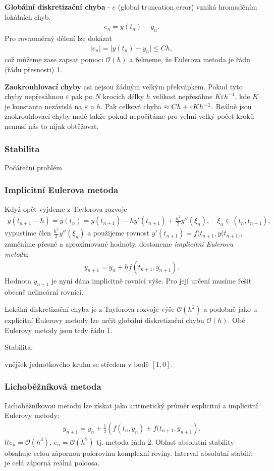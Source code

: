 \textbf{Globální diskretizační chyba} - $e$ (global truncation error) vzniká hromaděním lokálních chyb. 
\begin{align}
e_{n}= y(t_{n})-y_{n}.
\end{align}
Pro rovnoměrný dělení lze dokázat 
\begin{align}
\vert e_{n} \vert = \vert y(t_{n})-y_{n} \vert \leq C h,
\end{align}
což můžeme zase zapsat pomoci $\mathcal{O}(h)$ a řekneme, že Eulerova metoda je řádu (řádu přesnosti) 1. 

\textbf{Zaokrouhlovací chyby} asi nejsou žádným velkým překvápkem. Pokud tyto chyby nepřesáhnou $\varepsilon$ pak po $N$ krocích délky $h$ velikost nepřesáhne $K \varepsilon h^{-1}$, kde $K$ je konstanta nezávislá na $\varepsilon$ a $ h$. Pak celková chyba $\approx Ch+ \varepsilon K h^{-1}$. Reálně jsou zaokrouhlovací chyby malé takže pokud nepočítáme pro velmi velký počet kroků nemusí nás to nijak obtěžovat. 

\subsubsection*{Stabilita}
Počáteční problém
\subsubsection*{Implicitní Eulerova metoda}
Když opět vyjdeme z Taylorova rozvoje
\begin{align}
y(t_{n+1}-h)= y(t_{n}) = y(t_{n+1}) -hy'(t_{n+1})+ \frac{h^{2}}{2} y'' (\xi_{n}), \quad \xi_{n} \in (t_{n},t_{n+1}),
\end{align}
vypustíme člen $\frac{h^{2}}{2} y'' (\xi_{n})$ a použijeme rovnost $y'(t_{n+1})=f(t_{n+1},y(t_{n+1)}$, zaměníme přesné a aproximované hodnoty, dostaneme \textit{implicitní Eulerovu metodu}:
\begin{align}
y_{n+1}=y_{n}+h f(t_{n+1},y_{n+1}).
\end{align}
Hodnota $y_{n+1}$ je nyní dána implicitně rovnicí výše. Pro její určení musíme řešit obecně nelineární rovnici. 

Lokální diskretizační chyba je z Taylorova rozvoje výše  $\mathcal{O}(h^{2})$ a podobně jako u explicitní Eulerovy metody lze určit globální diskretizační chybu $\mathcal{O}(h)$. Obě Eulerovy metody jsou tedy řádu 1. 

Stabilita: 

vnějšek jednotkového kruhu se středem v bodě $[1,0]$. 

\subsubsection*{Lichoběžníková metoda}
Lichoběžníkovou metodu lze získat jako aritmetický průměr explicitní a implicitní Eulerovy metody:
\begin{align}
y_{n+1}= y_{n}+ \frac{1}{2} \left( f(t_{n},y_{n}) + f(t_{n+1},y_{n+1} \right).
\end{align}
$lte_{n} = \mathcal{O}(h^{3})$, $e_{n}= \mathcal{O}(h^{2})$ tj. metoda řádu 2. Oblast absolutní stability obsahuje celou zápornou polorovinu komplexní roviny. Interval absolutní stabilit je celá záporná reálná poloosa.  

